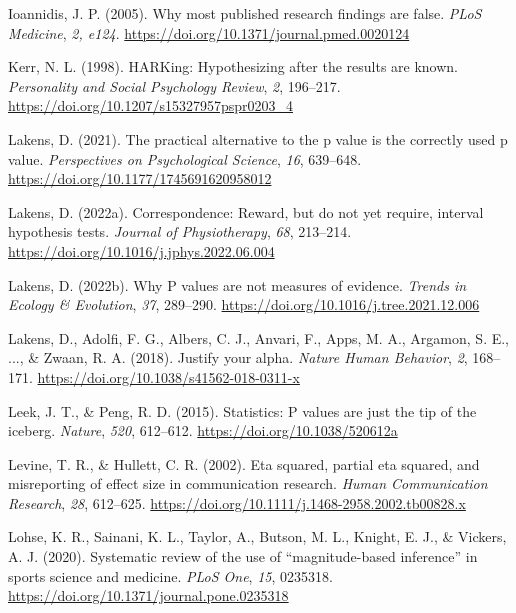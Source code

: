 \documentclass[]{cik}%
\newlength{\cslhangindent}
\newlength{\cslentryspacingunit} %
\newenvironment{CSLReferences}[2] %
 {%
  \setlength{\parindent}{0pt}
  \ifodd #1
  \let\oldpar\par
  \def\par{\hangindent=\cslhangindent\oldpar}
  \fi
  \setlength{\parskip}{#2\cslentryspacingunit}
 }%
 {}
\begin{document}
\begin{CSLReferences}{1}{0}
\leavevmode{}%
Ioannidis, J. P. (2005). Why most published research findings are false.
\emph{PLoS Medicine}, \emph{2, e124}.
\url{https://doi.org/10.1371/journal.pmed.0020124}

\leavevmode{}%
Kerr, N. L. (1998). HARKing: Hypothesizing after the results are known.
\emph{Personality and Social Psychology Review}, \emph{2}, 196--217.
\url{https://doi.org/10.1207/s15327957pspr0203_4}

\leavevmode{}%
Lakens, D. (2021). The practical alternative to the p value is the
correctly used p value. \emph{Perspectives on Psychological Science},
\emph{16}, 639--648. \url{https://doi.org/10.1177/1745691620958012}

\leavevmode{}%
Lakens, D. (2022a). Correspondence: Reward, but do not yet require,
interval hypothesis tests. \emph{Journal of Physiotherapy}, \emph{68},
213--214. \url{https://doi.org/10.1016/j.jphys.2022.06.004}

\leavevmode{}%
Lakens, D. (2022b). Why P values are not measures of evidence.
\emph{Trends in Ecology \& Evolution}, \emph{37}, 289--290.
\url{https://doi.org/10.1016/j.tree.2021.12.006}

\leavevmode{}%
Lakens, D., Adolfi, F. G., Albers, C. J., Anvari, F., Apps, M. A.,
Argamon, S. E., ..., \& Zwaan, R. A. (2018). Justify your alpha.
\emph{Nature Human Behavior}, \emph{2}, 168--171.
\url{https://doi.org/10.1038/s41562-018-0311-x}

\leavevmode{}%
Leek, J. T., \& Peng, R. D. (2015). Statistics: P values are just the
tip of the iceberg. \emph{Nature}, \emph{520}, 612--612.
\url{https://doi.org/10.1038/520612a}

\leavevmode{}%
Levine, T. R., \& Hullett, C. R. (2002). Eta squared, partial eta
squared, and misreporting of effect size in communication research.
\emph{Human Communication Research}, \emph{28}, 612--625.
\url{https://doi.org/10.1111/j.1468-2958.2002.tb00828.x}

\leavevmode{}%
Lohse, K. R., Sainani, K. L., Taylor, A., Butson, M. L., Knight, E. J.,
\& Vickers, A. J. (2020). Systematic review of the use of
{``magnitude-based inference''} in sports science and medicine.
\emph{PLoS One}, \emph{15}, 0235318.
\url{https://doi.org/10.1371/journal.pone.0235318}


\end{CSLReferences}
\end{document}
